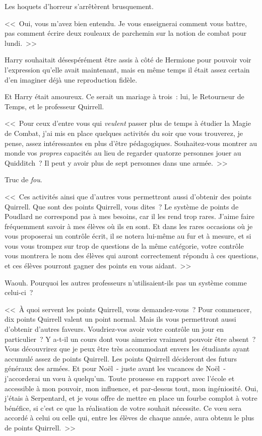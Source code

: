 Les hoquets d'horreur s'arrêtèrent brusquement.

<<~Oui, vous m'avez bien entendu. Je vous enseignerai comment vous battre, pas comment écrire deux rouleaux de parchemin sur la notion de combat pour lundi.~>>

Harry souhaitait désespérément être assis à côté de Hermione pour pouvoir voir l'expression qu'elle avait maintenant, mais en même temps il était assez certain d'en imaginer déjà une reproduction fidèle.

Et Harry était amoureux. Ce serait un mariage à trois~: lui, le Retourneur de Temps, et le professeur Quirrell.

<<~Pour ceux d'entre vous qui \emph{veulent} passer plus de temps à étudier la Magie de Combat, j'ai mis en place quelques activités du soir que vous trouverez, je pense, assez intéressantes en plus d'être pédagogiques. Souhaitez-vous montrer au monde vos \emph{propres} capacités au lieu de regarder quatorze personnes jouer au Quidditch~? Il peut y avoir plus de sept personnes dans une armée.~>>

Truc de \emph{fou}.

<<~Ces activités ainsi que d'autres vous permettront aussi d'obtenir des points Quirrell. Que sont des points Quirrell, vous dites~? Le système de points de Poudlard ne correspond pas à mes besoins, car il les rend trop rares. J'aime faire fréquemment savoir à mes élèves où ils en sont. Et dans les rares occasions où je vous proposerai un contrôle écrit, il se notera lui-même au fur et à mesure, et si vous vous trompez sur trop de questions de la même catégorie, votre contrôle vous montrera le nom des élèves qui auront correctement répondu à ces questions, et ces élèves pourront gagner des points en vous aidant.~>>

Waouh. Pourquoi les autres professeurs n'utilisaient-ils pas un système comme celui-ci~?

<<~À quoi servent les points Quirrell, vous demandez-vous~? Pour commencer, dix points Quirrell valent un point normal. Mais ils vous permettront aussi d'obtenir d'autres faveurs. Voudriez-vos avoir votre contrôle un jour en particulier~? Y a-t-il un cours dont vous aimeriez vraiment pouvoir être absent~? Vous découvrirez que je peux être très accommodant envers les étudiants ayant accumulé assez de points Quirrell. Les points Quirrell décideront des futurs généraux des armées. Et pour Noël~- juste avant les vacances de Noël~- j'accorderai un vœu à quelqu'un. Toute prouesse en rapport avec l'école et accessible à mon pouvoir, mon influence, et par-dessus tout, mon ingéniosité. Oui, j'étais à Serpentard, et je vous offre de mettre en place un fourbe complot à votre bénéfice, si c'est ce que la réalisation de votre souhait nécessite. Ce vœu sera accordé à celui ou celle qui, entre les élèves de chaque année, aura obtenu le plus de points Quirrell.~>>


